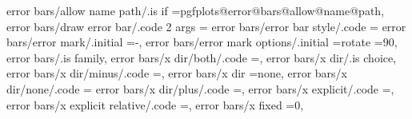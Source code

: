 error bars/allow name path/.is if                                  =pgfplots@error@bars@allow@name@path,                                                                                               
error bars/draw error bar/.code 2 args                             ={                                                                                                                                 
error bars/error bar style/.code                                   ={                                                                                                                                 
error bars/error mark/.initial                                     ={-},                                                                                                                               
error bars/error mark options/.initial                             ={rotate                                                                                                                            =90},                                                      
error bars/.is family,
error bars/x dir/both/.code                                        =\def\pgfplots@errorbars@xdirection{3}\pgfplots@errorbars@enabledtrue,                                                              
error bars/x dir/.is choice,
error bars/x dir/minus/.code                                       =\def\pgfplots@errorbars@xdirection{2}\pgfplots@errorbars@enabledtrue,                                                              
error bars/x dir                                                   =none,                                                                                                                              
error bars/x dir/none/.code                                        ={                                                                                                                                 
error bars/x dir/plus/.code                                        =\def\pgfplots@errorbars@xdirection{1}\pgfplots@errorbars@enabledtrue,                                                              
error bars/x explicit/.code                                        =\def\pgfplots@errorbars@xmode{2},                                                                                                  
error bars/x explicit relative/.code                               =\def\pgfplots@errorbars@xmode{3},                                                                                                  
error bars/x fixed                                                 =0,                                                                                                                                 
}}}
